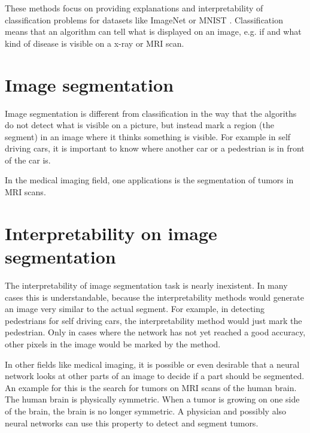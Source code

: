 These methods focus on providing explanations and interpretability of classification problems for datasets like ImageNet \cite{imagenet_cvpr09} or MNIST \cite{lecun-mnisthandwrittendigit-2010}. Classification means that an algorithm can tell what is displayed on an image, e.g. if and what kind of disease is visible on a x-ray or MRI scan.

\section{Image segmentation}
Image segmentation is different from classification in the way that the algoriths do not detect what is visible on a picture, but instead mark a region (the segment) in an image where it thinks something is visible. For example in self driving cars, it is important to know where another car or a pedestrian is in front of the car is. 

In the medical imaging field, one applications is the segmentation of tumors in MRI scans.

\section{Interpretability on image segmentation}
The interpretability of image segmentation task is nearly inexistent. In many cases this is understandable, because the interpretability methods would generate an image very similar to the actual segment. For example, in detecting pedestrians for self driving cars, the interpretability method would just mark the pedestrian. Only in cases where the network has not yet reached a good accuracy, other pixels in the image would be marked by the method.

In other fields like medical imaging, it is possible or even desirable that a neural network looks at other parts of an image to decide if a part should be segmented. An example for this is the search for tumors on MRI scans of the human brain. The human brain is physically symmetric. When a tumor is growing on one side of the brain, the brain is no longer symmetric. A physician and possibly also neural networks can use this property to detect and segment tumors.

